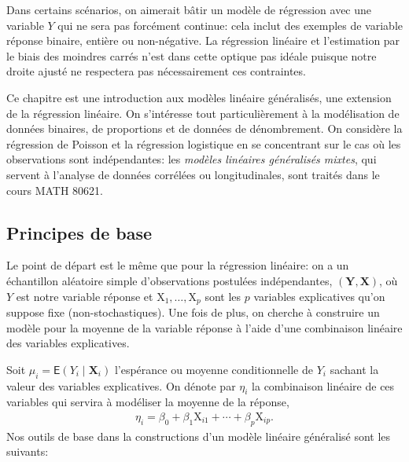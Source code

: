 \documentclass[
  11pt,
  letterpaper,
]{article}
\theoremstyle{definition}
\theoremstyle{definition}
\theoremstyle{definition}
\theoremstyle{definition}
\theoremstyle{remark}
\begin{document}
Dans certains scénarios, on aimerait bâtir un modèle de régression avec une variable \(Y\) qui ne sera pas forcément continue: cela inclut des exemples de variable réponse binaire, entière ou non-négative. La régression linéaire et l'estimation par le biais des moindres carrés n'est dans cette optique pas idéale puisque notre droite ajusté ne respectera pas nécessairement ces contraintes.

Ce chapitre est une introduction aux modèles linéaire généralisés, une extension de la régression linéaire. On s'intéresse tout particulièrement à la modélisation de données binaires, de proportions et de données de dénombrement. On considère la régression de Poisson et la régression logistique en se concentrant sur le cas où les observations sont indépendantes: les
\emph{modèles linéaires généralisés mixtes}, qui servent à l'analyse de données corrélées ou longitudinales, sont traités dans le cours MATH 80621.

\hypertarget{principes-de-base}{%
\subsection{Principes de base}\label{principes-de-base}}

Le point de départ est le même que pour la régression linéaire: on a un échantillon
aléatoire simple d'observations postulées indépendantes,
\((\boldsymbol{Y}, \mathbf{X})\), où \(Y\) est notre variable réponse et
\(\mathrm{X}_1, \ldots, \mathrm{X}_p\) sont les \(p\) variables explicatives qu'on suppose
fixe (non-stochastiques). Une fois de plus, on cherche à
construire un modèle pour la moyenne de la variable réponse à l'aide d'une combinaison linéaire des variables explicatives.

Soit \(\mu_i=\mathsf{E}(Y_i \mid \mathbf{X}_i)\) l'espérance ou moyenne conditionnelle de
\(Y_i\) sachant la valeur des variables explicatives. On dénote par \(\eta_i\) la combinaison linéaire
de ces variables qui servira à modéliser la moyenne de la réponse,
\begin{align*}
\eta_i=\beta_0 + \beta_1 \mathrm{X}_{i1} + \cdots + \beta_p \mathrm{X}_{ip}.
\end{align*}
Nos outils de base dans la constructions d'un modèle linéaire généralisé sont les suivants:
\end{document}
